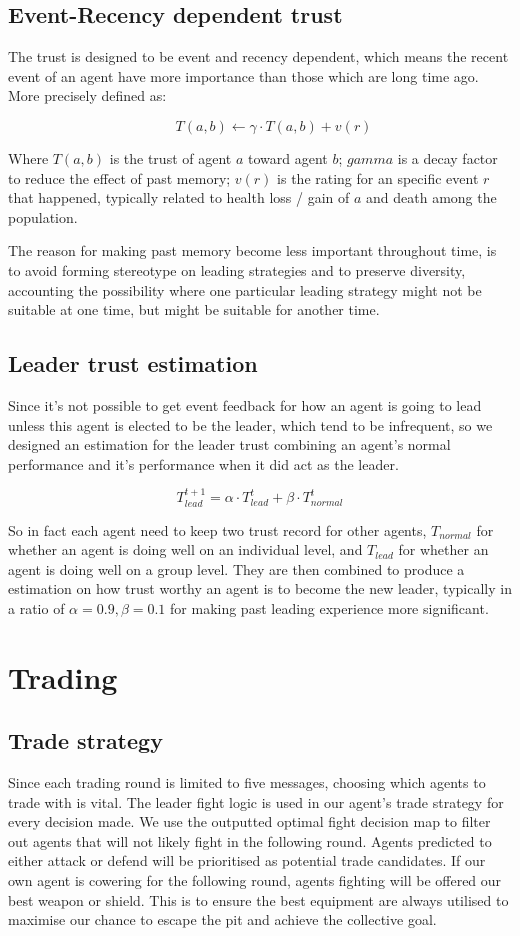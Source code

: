 \subsection{Event-Recency dependent trust}
The trust is designed to be event and recency dependent, which means the recent event of an agent have more importance than those which are long time ago. More precisely defined as:

$$
    \qquad T(a,b) \leftarrow \gamma \cdot T(a,b) + v(r)
$$

Where $T(a,b)$ is the trust of agent $a$ toward agent $b$; $gamma$ is a decay factor to reduce the effect of past memory; $v(r)$ is the rating for an specific event $r$ that happened, typically related to health loss / gain of $a$ and death among the population.

The reason for making past memory become less important throughout time, is to avoid forming stereotype on leading strategies and to preserve diversity, accounting the possibility where one particular leading strategy might not be suitable at one time, but might be suitable for another time.

\subsection{Leader trust estimation}
Since it's not possible to get event feedback for how an agent is going to lead unless this agent is elected to be the leader, which tend to be infrequent, so we designed an estimation for the leader trust combining an agent's normal performance and it's performance when it did act as the leader.

$$
    T_{lead}^{t+1} = \alpha \cdot T_{lead}^t + \beta \cdot T_{normal}^t
$$

So in fact each agent need to keep two trust record for other agents, $T_{normal}$ for whether an agent is doing well on an individual level, and $T_{lead}$ for whether an agent is doing well on a group level. They are then combined to produce a estimation on how trust worthy an agent is to become the new leader, typically in a ratio of $\alpha=0.9, \beta=0.1$ for making past leading experience more significant.

\section{Trading}

\subsection{Trade strategy}
Since each trading round is limited to five messages, choosing which agents to trade with is vital. The leader fight logic is used in our agent's trade strategy for every decision made. We use the outputted optimal fight decision map to filter out agents that will not likely fight in the following round. Agents predicted to either attack or defend will be prioritised as potential trade candidates. If our own agent is cowering for the following round, agents fighting will be offered our best weapon or shield. This is to ensure the best equipment are always utilised to maximise our chance to escape the pit and achieve the collective goal.

